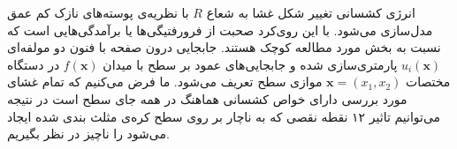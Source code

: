 انرژی کشسانی تغییر شکل غشا به شعاع
 $R$ 
با نظریه‌ی پوسته‌های نازک کم عمق مدل‌سازی می‌شود. با این روی‌کرد صحبت از فرورفتیگی‌ها یا برآمدگی‌هایی است که نسبت به بخش مورد مطالعه کوچک هستند. جابجایی درون صفحه با فنون دو مولفه‌ای 
$u_i(\boldsymbol{x})$ 
پارمتری‌سازی شده و جابجایی‌های عمود بر سطح با میدان 
$f(\boldsymbol{x})$
در دستگاه مختصات
$\boldsymbol{x}=(x_1,x_2)$
موازی سطح تعریف می‌‌شود. ما فرض می‌کنیم که تمام غشای مورد بررسی دارای خواص کشسانی هماهنگ در همه جای سطح است در نتیجه می‌توانیم تاثیر ۱۲ نقطه نقصی که به ناچار بر روی سطح کره‌ی مثلث بندی شده ایجاد می‌شود را ناچیز در نظر بگیریم.














































